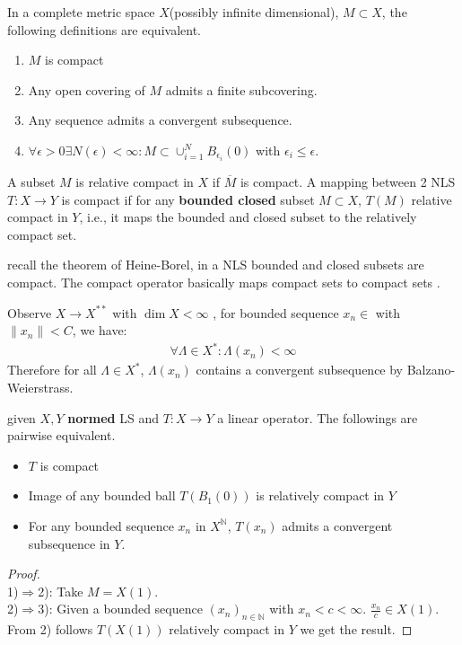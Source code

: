\begin{definition}[Compactness]
	In a complete metric space $X$(possibly infinite dimensional), $M \subset X$, the following definitions are equivalent.
	\begin{enumerate}
		\item $M$ is compact
		\item Any open covering of $M$ admits a finite subcovering.
		\item Any sequence admits a convergent subsequence. 
		\item $\forall \epsilon > 0 \exists N(\epsilon) < \infty: M \subset \cup_{i = 1}^N B_{\epsilon_i}(0)$ with $\epsilon_i \le \epsilon$. 
	\end{enumerate}
\end{definition}


\begin{definition}
	A subset $M$ is relative compact in $X$ if $\overline{M}$ is compact. A mapping between 2 NLS $T:X\rightarrow Y$ is compact if for any \textbf{bounded closed} subset $M \subset X$, $T(M)$ relative compact in $Y$, i.e., it maps the bounded and closed subset to the relatively compact set. 
\end{definition}
\begin{remark}
recall the theorem of Heine-Borel, in a NLS bounded and closed subsets are compact. The compact operator basically maps compact sets to compact sets	.
\end{remark}


\begin{example}
	Observe $X \rightarrow X^{**}$ with $\dim X < \infty$ , for bounded sequence $x_n \in $ with $\|x_n\| < C$, we have:
	\begin{align*}
		\forall \Lambda \in X^*: \Lambda(x_n)< \infty
	\end{align*} 
	Therefore for all $\Lambda \in X^*$, $\Lambda(x_n)$ contains a convergent subsequence by Balzano-Weierstrass.
\end{example}


\begin{theorem}
	given $X, Y$ \textbf{normed} LS and $T:X \rightarrow Y$ a linear operator. The followings are pairwise equivalent.
	\begin{itemize}
		\item $T$ is compact
		\item Image of any bounded ball $T(B_1(0))$ is relatively compact in $Y$
		\item For any bounded sequence $x_n$ in $X^{\mathbb{N}}$, $T(x_n)$ admits a convergent subsequence in $Y$.
	\end{itemize}
\end{theorem}
\begin{proof}\quad\\
	1)$\Rightarrow$2): Take $M = X(1)$.\\
	2)$\Rightarrow$3): Given a bounded sequence $(x_n)_{n \in \mathbb{N}}$ with $x_n < c < \infty$. $\frac{x_n}{c} \in X(1)$.  From 2) follows $T(X(1))$ relatively compact in $Y$ we get the result.
\end{proof}



